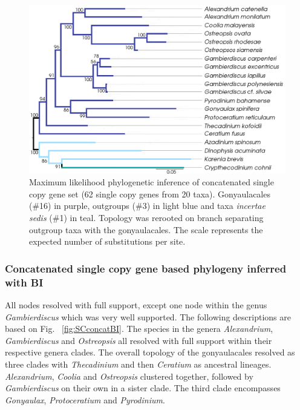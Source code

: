\documentclass[12pt]{article}
\begin{document}
\begin{figure} 
\includegraphics[scale=.45]{figures/SC-concat-ML_WAG.png} 
\caption{Maximum likelihood phylogenetic inference of concatenated single copy gene set (62 single copy genes from 20 taxa). Gonyaulacales (\#16) in purple, outgroups (\#3) in light blue and taxa \textit{incertae sedis} (\#1) in teal. Topology was rerooted on branch separating outgroup taxa with the gonyaulacales. The scale represents the expected number of substitutions per site.} 
\label{fig:SCconcatML}
\end{figure} 
\FloatBarrier

\subsubsection{Concatenated single copy gene based phylogeny inferred with BI}
\FloatBarrier 
All nodes resolved with full support, except one node within the genus \textit{Gambierdiscus} which was very well supported. 
The following descriptions are based on Fig. ~\ref{fig:SCconcatBI}. 
The species in the genera \textit{Alexandrium}, \textit{Gambierdiscus} and \textit{Ostreopsis} all resolved with full support within their respective genera clades. 
The overall topology of the gonyaulacales resolved as three clades with \textit{Thecadinium} and then \textit{Ceratium} as ancestral lineages. 
\textit{Alexandrium}, \textit{Coolia} and \textit{Ostreopsis} clustered together, followed by \textit{Gambierdiscus} on their own in a sister clade. 
The third clade encompasses \textit{Gonyaulax}, \textit{Protoceratium} and \textit{Pyrodinium}. 
\end{document}
